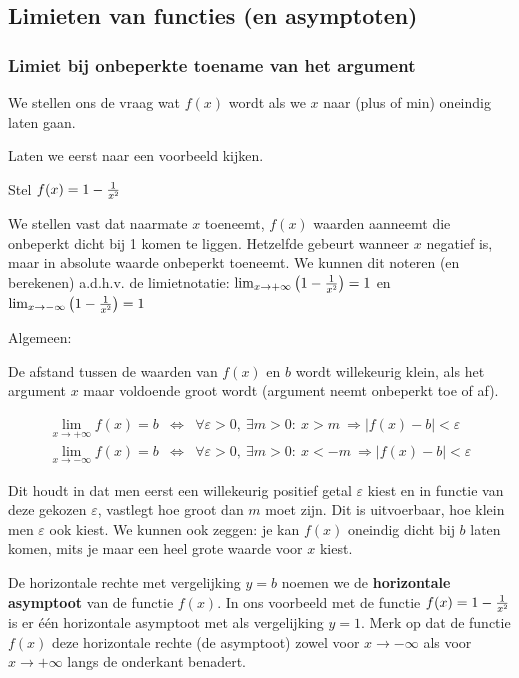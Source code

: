 \subsection{Limieten van functies (en asymptoten)}


\subsubsection{Limiet bij onbeperkte toename van het argument}

We stellen ons de vraag wat $f(x)$ wordt als we $x$ naar (plus of
min) oneindig laten gaan.

Laten we eerst naar een voorbeeld kijken. 
\begin{voorbeeld}
Stel $f(x)= 1-\frac{1}{x\text{\texttwosuperior}}$


We stellen vast dat naarmate $x$ toeneemt, $f(x)$ waarden
aanneemt die onbeperkt dicht bij 1 komen te liggen. Hetzelfde gebeurt
wanneer $x$ negatief is, maar in absolute waarde onbeperkt toeneemt.
We kunnen dit noteren (en berekenen) a.d.h.v. de limietnotatie: $\lim_{x\to+\infty}\left(1-\frac{1}{x\text{\texttwosuperior}}\right)=1$
en $\lim_{x\to-\infty}\left(1-\frac{1}{x\text{\texttwosuperior}}\right)=1$
\end{voorbeeld}

Algemeen:

De afstand tussen de waarden van $f(x)$ en $b$ wordt willekeurig
klein, als het argument $x$ maar voldoende groot wordt (argument
neemt onbeperkt toe of af).


\begin{eqnarray*}
 \lim_{x\to+\infty}f(x)=b & \Leftrightarrow & \forall\varepsilon>0,\:\exists m>0:\:x>m\:\Rightarrow\left|f(x)-b\right|<\varepsilon\\
 \lim_{x\to-\infty}f(x)=b & \Leftrightarrow & \forall\varepsilon>0,\:\exists m>0:\:x<-m\:\Rightarrow\left|f(x)-b\right|<\varepsilon
\end{eqnarray*}

Dit houdt in dat men eerst een willekeurig positief getal $\varepsilon$
kiest en in functie van deze gekozen $\varepsilon$, vastlegt hoe
groot dan $m$ moet zijn. Dit is uitvoerbaar, hoe klein men $\varepsilon$
ook kiest. We kunnen ook zeggen: je kan $f(x)$ oneindig dicht bij
$b$ laten komen, mits je maar een heel grote waarde voor $x$ kiest.

De horizontale rechte met vergelijking $y=b$ noemen we de \textbf{horizontale
asymptoot} van de functie $f(x)$. In ons voorbeeld met de functie
$f(x)= 1-\frac{1}{x\text{\texttwosuperior}}$ is er
\'e\'en horizontale asymptoot met als vergelijking $y=1$. Merk op dat
de functie $f(x)$ deze horizontale rechte (de asymptoot) zowel voor
$x\rightarrow-\infty$ als voor $x\rightarrow+\infty$ langs de onderkant
benadert.

